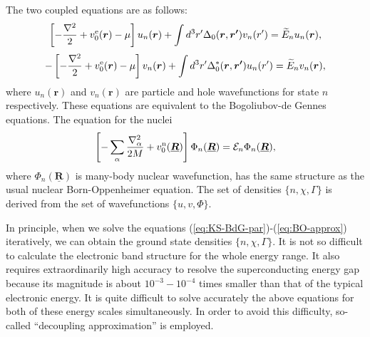 The two coupled equations are as follows:
%
\begin{equation}
	\left[-\frac{\nabla^2}{2} + v^{\rm e}_0(\bm{r}) - \mu \right]u_n(\bm{r}) +
	\int d^3r'\Delta_0(\bm{r},\bm{r'})v_n({r'}) = \widetilde{E}_n u_n(\bm{r}),
	\label{eq:KS-BdG-par}
\end{equation}
%
\begin{equation}
	-\left[-\frac{\nabla^2}{2} + v^{\rm e}_0(\bm{r}) - \mu \right]v_n(\bm{r}) +
	\int d^3r'\Delta^{\ast}_0(\bm{r},\bm{r'})u_n({r'}) = \widetilde{E}_n v_n(\bm{r}),
	\label{eq:KS-BdG-hole}
\end{equation}
%
where $u_n(\bm{r})$ and $v_n(\bm{r})$ are particle and hole wavefunctions for state $n$ respectively.
These equations are equivalent to the Bogoliubov-de Gennes equations\cite{BdG1958}. %
The equation for the nuclei
%
\begin{equation}
	\left[-\sum_{\alpha}\frac{\nabla^2_\alpha}{2M} + v^{\rm n}_0(\underline{\bm{R}}) \right]
	\Phi_n(\underline{\bm{R}}) = {\mathcal E}_n\Phi_n(\underline{\bm{R}}),
	\label{eq:BO-approx}
\end{equation}
%
where $\Phi_n(\underline{\bm{R}})$ is many-body nuclear wavefunction, has the same structure as 
the usual nuclear Born-Oppenheimer equation. The set of densities $\{n, \chi, \Gamma\}$ is 
derived from the set of wavefunctions $\{u, v, \Phi\}$.
%

In principle, when we solve the equations (\ref{eq:KS-BdG-par})-(\ref{eq:BO-approx}) iteratively, 
we can obtain the ground state densities $\{n, \chi, \Gamma\}$.
It is not so difficult to calculate the electronic band structure for the whole energy range.
It also requires extraordinarily high accuracy to resolve the superconducting energy gap
because its magnitude is about $10^{-3} - 10^{-4}$ times smaller than that of the typical electronic energy.
It is quite difficult to solve accurately the above equations for both of these energy scales simultaneously.
In order to avoid this difficulty, so-called ``decoupling approximation''\cite{Gross1991,KurthphD,LudersphD} is employed.

